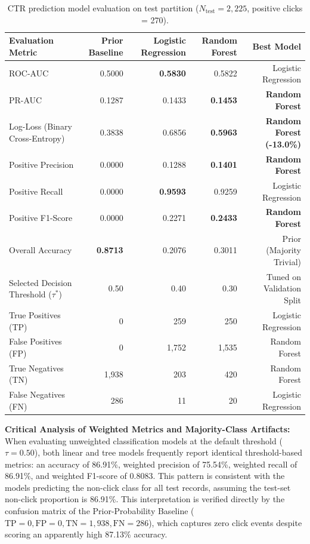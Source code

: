\documentclass[10pt,a4paper,twoside]{article}
\begin{document}
\begin{table}[ht]
\centering
\small
\caption{CTR prediction model evaluation on test partition ($N_{\text{test}} = 2,225$, positive clicks = 270).}
\label{tab:ctr_comparison}
\begin{tabular}{lrrrr}
\toprule
\textbf{Evaluation Metric} & \textbf{Prior Baseline} & \textbf{Logistic Regression} & \textbf{Random Forest} & \textbf{Best Model} \\
\midrule
ROC-AUC & 0.5000 & \textbf{0.5830} & 0.5822 & Logistic Regression \\
PR-AUC & 0.1287 & 0.1433 & \textbf{0.1453} & \textbf{Random Forest} \\
Log-Loss (Binary Cross-Entropy) & 0.3838 & 0.6856 & \textbf{0.5963} & \textbf{Random Forest (-13.0\%)} \\
Positive Precision & 0.0000 & 0.1288 & \textbf{0.1401} & \textbf{Random Forest} \\
Positive Recall & 0.0000 & \textbf{0.9593} & 0.9259 & Logistic Regression \\
Positive F1-Score & 0.0000 & 0.2271 & \textbf{0.2433} & \textbf{Random Forest} \\
Overall Accuracy & \textbf{0.8713} & 0.2076 & 0.3011 & Prior (Majority Trivial) \\
Selected Decision Threshold ($\tau^*$) & 0.50 & 0.40 & 0.30 & Tuned on Validation Split \\
True Positives (TP) & 0 & 259 & 250 & Logistic Regression \\
False Positives (FP) & 0 & 1,752 & 1,535 & Random Forest \\
True Negatives (TN) & 1,938 & 203 & 420 & Random Forest \\
False Negatives (FN) & 286 & 11 & 20 & Logistic Regression \\
\bottomrule
\end{tabular}
\end{table}

\noindent\textbf{Critical Analysis of Weighted Metrics and Majority-Class Artifacts:}  
When evaluating unweighted classification models at the default threshold ($\tau = 0.50$), both linear and tree models frequently report identical threshold-based metrics: an accuracy of 86.91\%, weighted precision of 75.54\%, weighted recall of 86.91\%, and weighted F1-score of 0.8083. This pattern is consistent with the models predicting the non-click class for all test records, assuming the test-set non-click proportion is 86.91\%. This interpretation is verified directly by the confusion matrix of the Prior-Probability Baseline ($\text{TP} = 0, \text{FP} = 0, \text{TN} = 1,938, \text{FN} = 286$), which captures zero click events despite scoring an apparently high 87.13\% accuracy.
\end{document}
